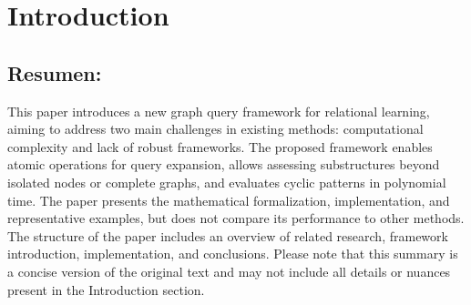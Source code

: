 \documentclass{article}%
\begin{document}
%
\normalsize%
\clearpage%
\section{Introduction}%
\label{sec:Introduction}%
\subsection{Resumen:}%
\label{subsec:Resumen}%
This paper introduces a new graph query framework for relational learning, aiming to address two main challenges in existing methods: computational complexity and lack of robust frameworks. The proposed framework enables atomic operations for query expansion, allows assessing substructures beyond isolated nodes or complete graphs, and evaluates cyclic patterns in polynomial time. The paper presents the mathematical formalization, implementation, and representative examples, but does not compare its performance to other methods. The structure of the paper includes an overview of related research, framework introduction, implementation, and conclusions.\newline%
\newline%
Please note that this summary is a concise version of the original text and may not include all details or nuances present in the Introduction section.

%
\end{document}
